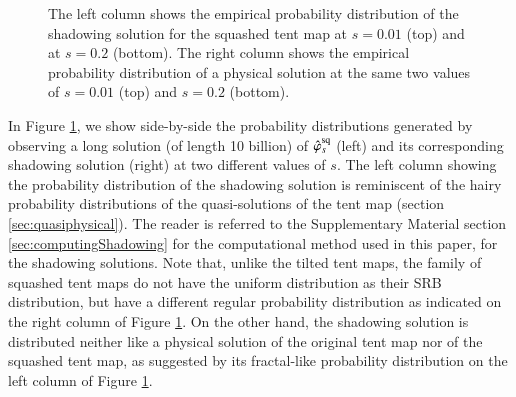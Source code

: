\documentclass[preprint,12pt]{elsarticle}
\begin{document}
\begin{figure}
    \caption{The left column shows the empirical probability distribution of the shadowing solution for the squashed tent map at $s=0.01$ (top) and at $s=0.2$ (bottom). The right column shows the empirical probability distribution of a physical solution at the same two values of $s = 0.01$ (top) and $s = 0.2$ (bottom).}
    \label{fig:tent_squashed_shadow}
\end{figure}
In Figure \ref{fig:tent_squashed_shadow}, we show side-by-side the probability distributions generated by observing a long solution (of length 10 billion) 
of $\hat{\varphi}^{\rm sq}_s$ (left) and its corresponding shadowing solution (right)
at two different values of $s.$ The left column showing the probability distribution of the shadowing solution is reminiscent of the hairy probability distributions of 
the quasi-solutions of the tent map (section \ref{sec:quasiphysical}). The reader is referred to the Supplementary Material section \ref{sec:computingShadowing} for the computational method used in this paper, for the shadowing solutions. Note that, unlike the tilted tent maps, the family of squashed tent maps do not have the uniform distribution as their SRB distribution, but have a different regular probability distribution as indicated on the right column of Figure \ref{fig:tent_squashed_shadow}. On the other hand, the shadowing solution is distributed neither like a physical solution of the original tent map nor of the squashed tent map, as suggested by its fractal-like probability distribution on the left column of Figure \ref{fig:tent_squashed_shadow}.
\end{document}
